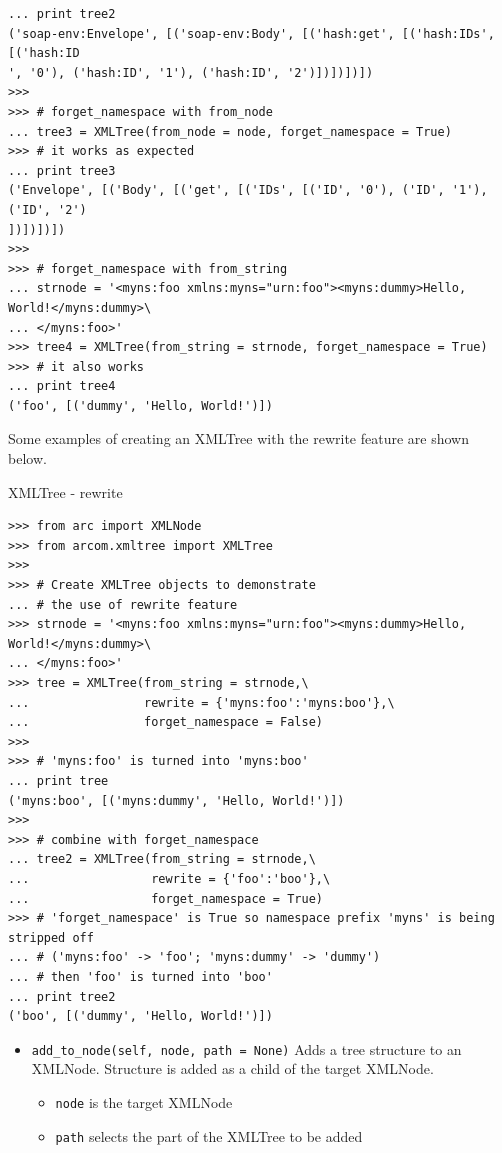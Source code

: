 \documentclass{article}
\begin{document}
\begin{flushleft}
\begin{itemize}
{\begin{example}
\begin{verbatim}
... print tree2
('soap-env:Envelope', [('soap-env:Body', [('hash:get', [('hash:IDs', [('hash:ID
', '0'), ('hash:ID', '1'), ('hash:ID', '2')])])])])
>>> 
>>> # forget_namespace with from_node
... tree3 = XMLTree(from_node = node, forget_namespace = True)
>>> # it works as expected
... print tree3
('Envelope', [('Body', [('get', [('IDs', [('ID', '0'), ('ID', '1'), ('ID', '2')
])])])])
>>> 
>>> # forget_namespace with from_string
... strnode = '<myns:foo xmlns:myns="urn:foo"><myns:dummy>Hello, World!</myns:dummy>\
... </myns:foo>'
>>> tree4 = XMLTree(from_string = strnode, forget_namespace = True)
>>> # it also works
... print tree4
('foo', [('dummy', 'Hello, World!')])
\end{verbatim}
    \end{example}
    Some examples of creating an XMLTree with the rewrite feature are shown below.
    \begin{example}
      \caption{XMLTree - rewrite}\label{xtrew}
\begin{verbatim}
>>> from arc import XMLNode
>>> from arcom.xmltree import XMLTree
>>> 
>>> # Create XMLTree objects to demonstrate
... # the use of rewrite feature
>>> strnode = '<myns:foo xmlns:myns="urn:foo"><myns:dummy>Hello, World!</myns:dummy>\
... </myns:foo>'
>>> tree = XMLTree(from_string = strnode,\
...                rewrite = {'myns:foo':'myns:boo'},\
...                forget_namespace = False)
>>> 
>>> # 'myns:foo' is turned into 'myns:boo'
... print tree
('myns:boo', [('myns:dummy', 'Hello, World!')])
>>> 
>>> # combine with forget_namespace
... tree2 = XMLTree(from_string = strnode,\
...                 rewrite = {'foo':'boo'},\
...                 forget_namespace = True)
>>> # 'forget_namespace' is True so namespace prefix 'myns' is being stripped off
... # ('myns:foo' -> 'foo'; 'myns:dummy' -> 'dummy')
... # then 'foo' is turned into 'boo' 
... print tree2
('boo', [('dummy', 'Hello, World!')])
\end{verbatim}
    \end{example}

    \begin{itemize}
      \item{ \verb$add_to_node(self, node, path = None)$ \linebreak
      Adds a tree structure to an XMLNode. Structure is added as a child of the target XMLNode.
        \begin{itemize}
          \item{\verb$node$ is the target XMLNode}
          \item{\verb$path$ selects the part of the XMLTree to be added}
        \end{itemize}
      }
    \end{itemize}

}
\end{itemize}
\end{flushleft}
\end{document}
